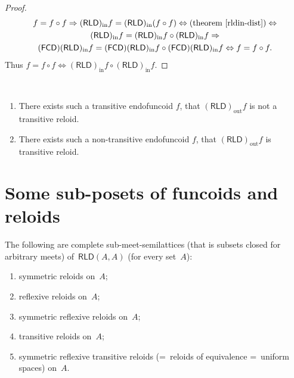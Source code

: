 \begin{proof}
\begin{multline*}
  f = f \circ f \Rightarrow (\mathsf{RLD})_{\operatorname{in}} f =
  (\mathsf{RLD})_{\operatorname{in}} (f \circ f) \Leftrightarrow \text{(theorem~\ref{rldin-dist})} \Leftrightarrow \\
  (\mathsf{RLD})_{\operatorname{in}} f =
  (\mathsf{RLD})_{\operatorname{in}} f \circ (\mathsf{RLD})_{\operatorname{in}}
  f \Rightarrow \\ (\mathsf{FCD}) (\mathsf{RLD})_{\operatorname{in}} f =
  (\mathsf{FCD}) (\mathsf{RLD})_{\operatorname{in}} f \circ
  (\mathsf{FCD}) (\mathsf{RLD})_{\operatorname{in}} f \Leftrightarrow f
  = f \circ f.
\end{multline*}
Thus $f = f \circ f \Leftrightarrow
  (\mathsf{RLD})_{\operatorname{in}} f \circ (\mathsf{RLD})_{\operatorname{in}}
  f$.
\end{proof}

\begin{conjecture}
  ~  
  \begin{enumerate}
    \item There exists such a transitive endofuncoid $f$, that
    $(\mathsf{RLD})_{\operatorname{out}} f$ is not a transitive reloid.
    
    \item There exists such a non-transitive endofuncoid $f$, that
    $(\mathsf{RLD})_{\operatorname{out}} f$ is transitive reloid.
  \end{enumerate}
\end{conjecture}

\section{Some sub-posets of funcoids and reloids}

\begin{prop}
The following are complete sub-meet-semilattices (that is subsets closed for arbitrary meets) of~$\mathsf{RLD}(A,A)$ (for every set~$A$):
\begin{enumerate}
\item symmetric reloids on~$A$;
\item reflexive reloids on~$A$;
\item symmetric reflexive reloids on~$A$;
\item transitive reloids on~$A$;
\item symmetric reflexive transitive reloids (=~reloids of equivalence =~uniform spaces) on~$A$.
\end{enumerate}
\end{prop}

